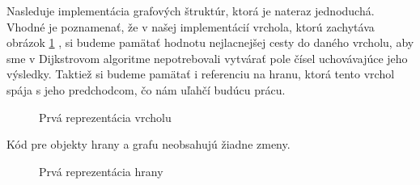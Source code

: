 Nasleduje implementácia grafových štruktúr, ktorá je nateraz jednoduchá. Vhodné je poznamenať, že v našej implementácií vrchola, ktorú zachytáva obrázok \ref{1_Vertex} , si budeme pamätať hodnotu nejlacnejšej cesty do daného vrcholu, aby sme v Dijkstrovom algoritme nepotrebovali vytvárať pole čísel uchovávajúce jeho výsledky. Taktiež si budeme pamätať i referenciu na hranu, ktorá tento vrchol spája s jeho predchodcom, čo nám uľahčí budúcu prácu.\newline

\begin{figure}[H]
  \caption{Prvá reprezentácia vrcholu}
  \label{1_Vertex}
\end{figure}

Kód pre objekty hrany a grafu neobsahujú žiadne zmeny.\newline

\begin{figure}[H]
  \caption{Prvá reprezentácia hrany}
  \label{1_Edge}
\end{figure}

